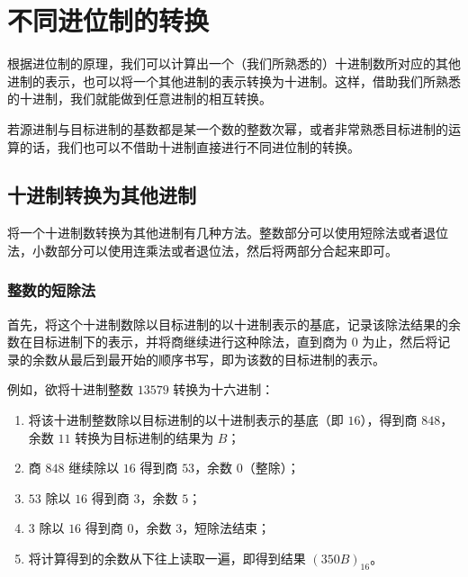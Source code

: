 \section{不同进位制的转换}\label{sec:ArithBasics/positional-notation-conversion}
    根据进位制的原理，我们可以计算出一个（我们所熟悉的）十进制数所对应的其他进制的表示，也可以将一个其他进制的表示转换为十进制。这样，借助我们所熟悉的十进制，我们就能做到任意进制的相互转换。

    若源进制与目标进制的基数都是某一个数的整数次幂，或者非常熟悉目标进制的运算的话，我们也可以不借助十进制直接进行不同进位制的转换。

    \subsection{十进制转换为其他进制}\label{subsec:ArithBasics/positional-notation-conversion/from-decimal}
        将一个十进制数转换为其他进制有几种方法。整数部分可以使用短除法或者退位法，小数部分可以使用连乘法或者退位法，然后将两部分合起来即可。
        \subsubsection{整数的短除法}\label{subsubsec:ArithBasics/positional-notation-conversion/from-decimal/integer-short-division}
            首先，将这个十进制数除以目标进制的以十进制表示的基底，记录该除法结果的余数在目标进制下的表示，并将商继续进行这种除法，直到商为 0 为止，然后将记录的余数从最后到最开始的顺序书写，即为该数的目标进制的表示。

            例如，欲将十进制整数 $13579$ 转换为十六进制：

            \begin{enumerate}
                \item 将该十进制整数除以目标进制的以十进制表示的基底（即 $16$），得到商 $848$，余数 $11$ 转换为目标进制的结果为 $B$；
                \item 商 $848$ 继续除以 $16$ 得到商 $53$，余数 $0$（整除）；
                \item $53$ 除以 $16$ 得到商 $3$，余数 $5$；
                \item $3$ 除以 $16$ 得到商 $0$，余数 $3$，短除法结束；
                \item 将计算得到的余数从下往上读取一遍，即得到结果 $(350B)_{16}$。
            \end{enumerate}

